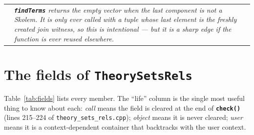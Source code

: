 \documentclass[11pt,a4paper]{article}
\makeatletter
\newcommand{\code}[1]{\texttt{\small #1}}
\newcommand{\fn}[1]{\texttt{\small\bfseries #1}}
\newcommand{\file}[1]{\texttt{\small #1}}
\theoremstyle{definition}
\newenvironment{sidenote}
  {\par\medskip\noindent\begin{tabular}{@{}p{0.02\textwidth}@{\hspace{4pt}}p{0.93\textwidth}@{}}
   \raisebox{-1pt}{\color{hl}\Large$\vartriangleright$} &\itshape}
  {\end{tabular}\par\medskip}
\makeatother
\begin{document}
\begin{sidenote}
\fn{findTerms} returns the empty vector when the last component is \emph{not} a
Skolem. It is only ever called with a tuple whose last element is the freshly
created join witness, so this is intentional --- but it is a sharp edge if the
function is ever reused elsewhere.
\end{sidenote}

\section{The fields of \code{TheorySetsRels}}

Table~\ref{tab:fields} lists every member. The ``life'' column is the single
most useful thing to know about each: \emph{call} means the field is cleared at
the end of \fn{check()} (lines 215--224 of \file{theory\_sets\_rels.cpp});
\emph{object} means it is never cleared; \emph{user} means it is a
context-dependent container that backtracks with the user context.
\end{document}
